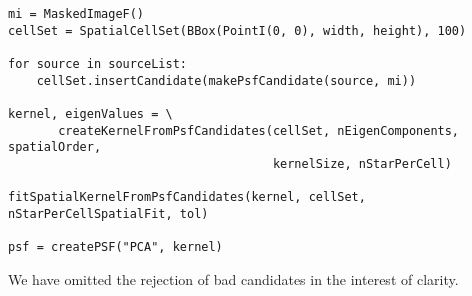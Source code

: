 \begin{center}
  \begin{minipage}{13cm}
    \small
\begin{verbatim}
mi = MaskedImageF()
cellSet = SpatialCellSet(BBox(PointI(0, 0), width, height), 100)

for source in sourceList:
    cellSet.insertCandidate(makePsfCandidate(source, mi))

kernel, eigenValues = \
       createKernelFromPsfCandidates(cellSet, nEigenComponents, spatialOrder,
                                     kernelSize, nStarPerCell)

fitSpatialKernelFromPsfCandidates(kernel, cellSet, nStarPerCellSpatialFit, tol)

psf = createPSF("PCA", kernel)
\end{verbatim}
  \end{minipage}
\end{center}
We have omitted the rejection of bad candidates in the interest of clarity.
